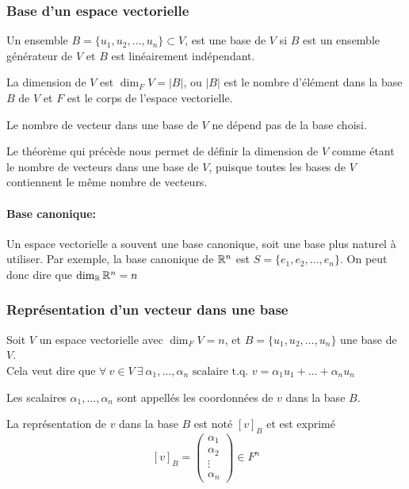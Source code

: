 \subsubsection{Base d'un espace vectorielle}
\begin{definition}
      Un ensemble $B = \{ u_1, u_2, \ldots, u_n \} \subset V$, est une base de $V$ si
      $B$ est un ensemble générateur de $V$ et $B$ est linéairement indépendant.
\end{definition}
\begin{definition}
      La dimension de $V$ est $\dim_F V = |B|$, ou $|B|$ est le nombre d'élément dans la base $B$
      de $V$ et $F$ est le corps de l'espace vectorielle.
\end{definition}
\begin{theorem}
      Le nombre de vecteur dans une base de $V$ ne dépend pas de la base choisi.
\end{theorem}
\begin{remark}
      Le théorème qui précède nous permet de définir la dimension de $V$ comme étant le
      nombre de vecteurs dans une base de $V$, puisque toutes les bases de $V$ contiennent
      le même nombre de vecteurs.
\end{remark}
\paragraph{Base canonique:}
Un espace vectorielle a souvent une base canonique, soit une base plus naturel à utiliser.
Par exemple, la base canonique de $\mathbb{R}^n$ est $S = \{ e_1, e_2, \ldots, e_n \}$.
On peut donc dire que $\dim_{\mathbb{R}} \mathbb{R}^n = n$

\subsubsection{Représentation d'un vecteur dans une base}
\noindent
Soit $V$ un espace vectorielle avec $\dim_F V = n$, et $B = \{ u_1, u_2, \ldots, u_n \}$ une base de $V$. \\
Cela veut dire que $ \forall \ v \in V  \ \exists \ \alpha_1, \ldots, \alpha_n \text{ scalaire t.q. } v = \alpha_1 u_1 + \ldots + \alpha_n u_n$
\begin{definition}
      Les scalaires $\alpha_1, \ldots, \alpha_n$ sont appellés les coordonnées de $v$ dans la base $B$.
\end{definition}
\begin{definition}
      La représentation de $v$ dans la base $B$ est noté $[v]_B$ et est exprimé
      \[
            [v]_B = \begin{pmatrix}
                  \alpha_1 \\
                  \alpha_2 \\
                  \vdots   \\
                  \alpha_n
            \end{pmatrix} \in F^n
      \]
\end{definition}

